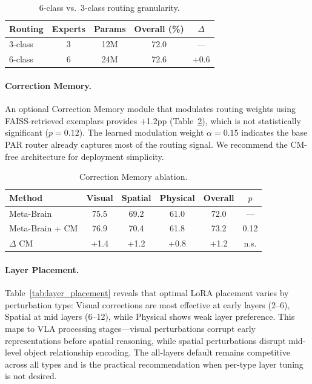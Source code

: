 \documentclass[10pt,twocolumn]{article}
\begin{document}
\begin{table}[h]
\centering
\caption{6-class vs.\ 3-class routing granularity.}
\label{tab:6vs3}
\small
\begin{tabular}{lcccc}
\toprule
Routing & Experts & Params & Overall (\%) & $\Delta$ \\
\midrule
3-class & 3 & 12M & 72.0 & --- \\
6-class & 6 & 24M & 72.6 & +0.6 \\
\bottomrule
\end{tabular}
\end{table}

\paragraph{Correction Memory.}
An optional Correction Memory module that modulates routing weights using FAISS-retrieved exemplars provides +1.2pp (Table~\ref{tab:cm}), which is not statistically significant ($p{=}0.12$).
The learned modulation weight $\alpha{=}0.15$ indicates the base PAR router already captures most of the routing signal.
We recommend the CM-free architecture for deployment simplicity.

\begin{table}[h]
\centering
\caption{Correction Memory ablation.}
\label{tab:cm}
\small
\begin{tabular}{lccccc}
\toprule
Method & Visual & Spatial & Physical & Overall & $p$ \\
\midrule
Meta-Brain & 75.5 & 69.2 & 61.0 & 72.0 & --- \\
Meta-Brain + CM & 76.9 & 70.4 & 61.8 & 73.2 & 0.12 \\
$\Delta$ CM & +1.4 & +1.2 & +0.8 & +1.2 & n.s. \\
\bottomrule
\end{tabular}
\end{table}

\paragraph{Layer Placement.}
Table~\ref{tab:layer_placement} reveals that optimal LoRA placement varies by perturbation type: Visual corrections are most effective at early layers (2--6), Spatial at mid layers (6--12), while Physical shows weak layer preference.
This maps to VLA processing stages---visual perturbations corrupt early representations before spatial reasoning, while spatial perturbations disrupt mid-level object relationship encoding.
The all-layers default remains competitive across all types and is the practical recommendation when per-type layer tuning is not desired.
\end{document}
